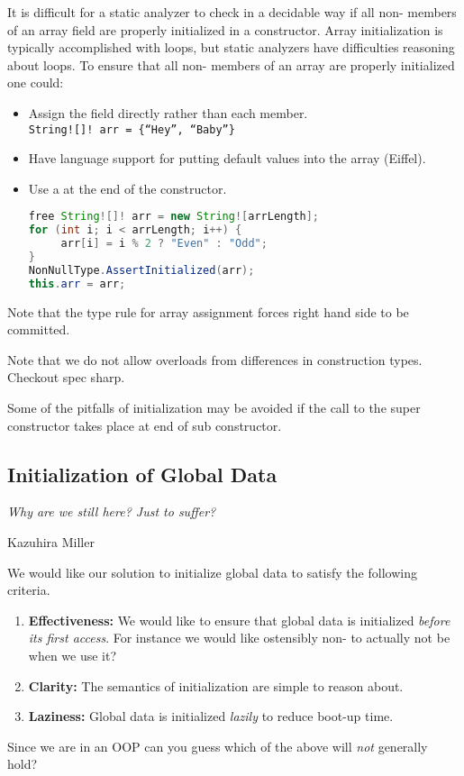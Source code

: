 \documentclass{article}
\begin{document}
\begin{definition}
  It is difficult for a static analyzer to check in a decidable way if all non-\cringe{} members of an array field are properly initialized in a constructor.
  Array initialization is typically accomplished with loops, but static analyzers have difficulties reasoning about loops.
  To ensure that all non-\cringe{} members of an array are properly initialized one could:
  \begin{itemize}
  \item Assign the field directly rather than each member. \\
    \texttt{String![]! arr = \{``Hey'', ``Baby''\}}
  \item Have language support for putting default values into the array (Eiffel).
  \item Use a \runtimecheck{} at the end of the constructor.
\begin{lstlisting}[escapechar=|, language=Java]
free String![]! arr = new String![arrLength];
for (int i; i < arrLength; i++) {
     arr[i] = i % 2 ? "Even" : "Odd";
}
NonNullType.AssertInitialized(arr);
this.arr = arr;
\end{lstlisting}
  \end{itemize}
  Note that the type rule for array assignment forces right hand side to be committed.
\end{definition}

Note that we do not allow overloads from differences in construction types. Checkout spec sharp.


\begin{remark}\label{remark:superatendofsub}
  Some of the pitfalls of initialization may be avoided if the call to the super constructor takes place at end of sub constructor.
\end{remark}

\subsection{Initialization of Global Data}

\epigraph{\itshape Why are we still here? Just to suffer?}{Kazuhira Miller}

\begin{definition}
  We would like our solution to initialize global data to satisfy the following criteria.
  \begin{enumerate}
  \item \textbf{Effectiveness:} We would like to ensure that global data is initialized \textit{before its first access}. For instance we would like ostensibly non-\cringe{} to actually not be \cringe{} when we use it?
  \item \textbf{Clarity:} The semantics of initialization are simple to reason about.
  \item \textbf{Laziness:} Global data is initialized \textit{lazily} to reduce boot-up time.
  \end{enumerate}
  Since we are in an OOP can you guess which of the above will \textit{not} generally hold?
\end{definition}
\end{document}
